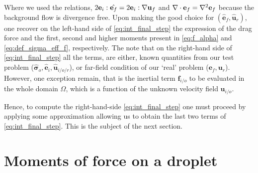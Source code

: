 Where we used the relations, $2{\textbf{e}_i} : \hat{\textbf{e}_f}= 2{\textbf{e}_i} : {\mathbf{\nabla}\textbf{u}_f}$ and $\mathbf{\nabla}\cdot\textbf{e}_f = \mathbf{\nabla}^2 \textbf{e}_f$ because the background flow is divergence free. 
Upon making the good choice for $(\hat{\textbf{e}}_f, \hat{\textbf{u}}_r)$, one recover on the left-hand side of \ref{eq:int_final_step} the expression of the drag force and the first, second and higher moments present in \ref{eq:f_alpha} and \ref{eq:def_sigma_eff_f}, respectively. 
The note that on the right-hand side of \ref{eq:int_final_step} all the terms, are either, known quantities from our test problem ($\hat{\bm\sigma}_{o},\hat{\textbf{e}}_i, \hat{\textbf{u}}_{i/o/r}$), or far-field condition of our `real' problem ($\textbf{e}_f,\textbf{u}_r$). 
However, one exception remain, that is the inertial term $\textbf{f}_{i/o}$ to be evaluated in the whole domain $\Omega$, which is a function of the unknown velocity field $\textbf{u}_{i/o}$. 

Hence, to compute the right-hand-side \ref{eq:int_final_step} one must proceed by applying some approximation allowing us to obtain the last two terms of \ref{eq:int_final_step}. 
This is the subject of the next section. 

\section{Moments of force on a droplet}


